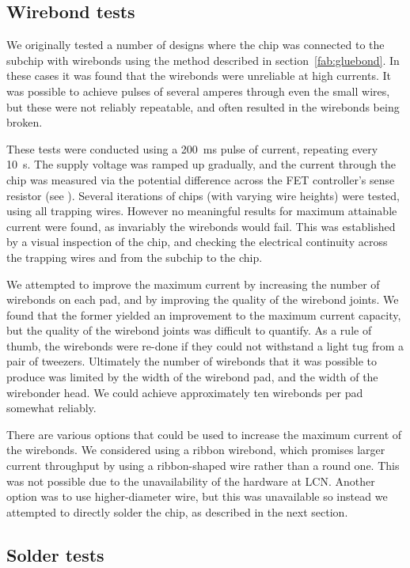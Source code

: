 \subsection{Wirebond tests}

We originally tested a number of designs where the chip was connected to the
subchip with wirebonds using the method described in
section~\ref{fab:gluebond}. In these cases it was found that the wirebonds were
unreliable at high currents. It was possible to achieve pulses of several
amperes through even the small wires, but these were not reliably repeatable,
and often resulted in the wirebonds being broken.

These tests were conducted using a \SI{200}{\milli\second} pulse of current,
repeating every \SI{10}{\second}. The supply voltage was ramped up gradually,
and the current through the chip was measured via the potential difference
across the FET controller's sense resistor (see ).
Several iterations of chips (with varying wire heights) were tested, using all
trapping wires. However no meaningful results for maximum attainable current
were found, as invariably the wirebonds would fail. This was established by a
visual inspection of the chip, and checking the electrical continuity across
the trapping wires and from the subchip to the chip.

We attempted to improve the maximum current by increasing the number of
wirebonds on each pad, and by improving the quality of the wirebond joints. We
found that the former yielded an improvement to the maximum current capacity,
but the quality of the wirebond joints was difficult to quantify. As a rule of
thumb, the wirebonds were re-done if they could not withstand a light tug from
a pair of tweezers. Ultimately the number of wirebonds that it was possible to
produce was limited by the width of the wirebond pad, and the width of the
wirebonder head. We could achieve approximately ten wirebonds per pad somewhat
reliably.

There are various options that could be used to increase the maximum current of
the wirebonds.  We considered using a ribbon wirebond, which promises larger
current throughput by using a ribbon-shaped wire rather than a round one.  This
was not possible due to the unavailability of the hardware at LCN.  Another
option was to use higher-diameter wire, but this was unavailable so  instead we
attempted to directly solder the chip, as described in the next section.

\subsection{Solder tests}


